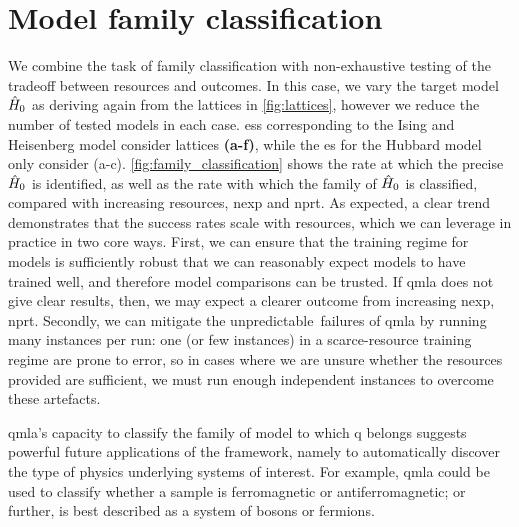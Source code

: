 \section{Model family classification}\label{sec:family_classification}
We combine the task of family classification 
    with non-exhaustive testing of the tradeoff between resources and outcomes.
In this case, we vary the target model $\hat{H}_0$ as deriving again from the lattices in 
    \cref{fig:lattices}, 
    however we reduce the number of tested models in each case. 
\glspl{es} corresponding to the Ising and Heisenberg model consider lattices \textbf{(a-f)}, 
    while the \gls{es} for the Hubbard model only consider (a-c). 
\cref{fig:family_classification} shows the rate at which the precise $\hat{H}_0$ is identified, 
    as well as the rate with which the family of $\hat{H}_0$ is classified, 
    compared with increasing resources, \gls{nexp} and \gls{nprt}. 
As expected, a clear trend demonstrates that the success rates scale with resources,
    which we can leverage in practice in two core ways.
First, we can ensure that the training regime for models is sufficiently robust 
    that we can reasonably expect models to have trained well, and therefore model comparisons can be trusted.
If \gls{qmla} does not give clear results, then, we may expect a clearer outcome from increasing \gls{nexp}, \gls{nprt}.
Secondly, we can mitigate the unpredictable\footnotemark \ failures of \gls{qmla} by running many \glspl{instance} per \gls{run}:
    one (or few \glspl{instance}) in a scarce-resource training regime are prone to error, 
    so in cases where we are unsure whether the resources provided are sufficient, 
    we must run enough independent \glspl{instance} to overcome these artefacts. 
\par 

\gls{qmla}'s capacity to classify the family of model to which \gls{q} belongs suggests powerful 
    future applications of the framework, namely to automatically discover the type of physics underlying 
    systems of interest.
For example, \gls{qmla} could be used to classify whether a sample is ferromagnetic or antiferromagnetic;
    or further, is best described as a system of bosons or fermions.

